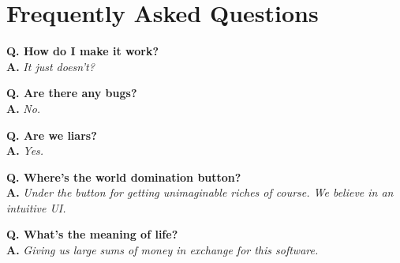 \section{Frequently Asked Questions}

\newcommand{\faqentry}[2]{\textbf{Q. #1}\\  \textbf{A.} \textit{#2}\vspace{0.5cm}}


\faqentry{How do I make it work?}{It just doesn't?}

\faqentry{Are there any bugs?}{No.}

\faqentry{Are we liars?}{Yes.}

\faqentry{Where's the world domination button?}{Under the button for getting unimaginable riches of course. We believe in an intuitive UI.}

\faqentry{What's the meaning of life?}{Giving us large sums of money in exchange for this software.}